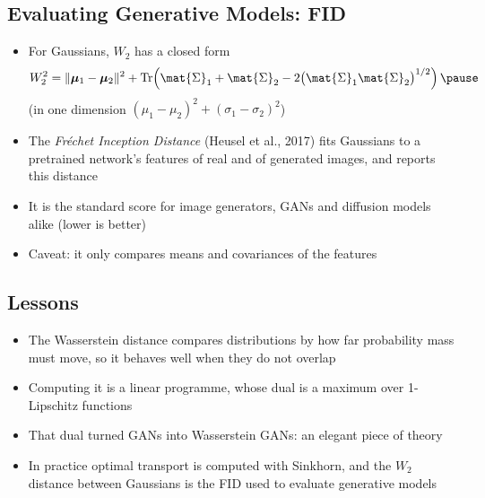 \begin{slide}
\section[-2]{Evaluating Generative Models: FID}

\begin{PauseHighLight}
  \begin{itemize}
  \item For Gaussians, $W_2$ has a closed form
    \begin{align*}
      W_2^2 = \|\bm{\mu}_1-\bm{\mu}_2\|^2 + \mathrm{Tr}\!\left(\mat{\Sigma}_1 +
      \mat{\Sigma}_2 - 2\bigl(\mat{\Sigma}_1\mat{\Sigma}_2\bigr)^{1/2}\right)\pause
    \end{align*}
    (in one dimension $(\mu_1-\mu_2)^2 + (\sigma_1-\sigma_2)^2$)\pause
  \item The \emph{Fr\'echet Inception Distance} (Heusel et al., 2017) fits
    Gaussians to a pretrained network's features of real and of
    generated images, and reports this distance\pause
  \item It is the standard score for image generators, GANs and
    diffusion models alike (lower is better)\pause
  \item Caveat: it only compares means and covariances of the
    features\pause
  \end{itemize}
\end{PauseHighLight}

\end{slide}


\begin{slide}
\section[-1]{Lessons}

\begin{PauseHighLight}
  \begin{itemize}
  \item The Wasserstein distance compares distributions by how far
    probability mass must move, so it behaves well when they do not
    overlap\pause
  \item Computing it is a linear programme, whose dual is a maximum
    over 1-Lipschitz functions\pause
  \item That dual turned GANs into Wasserstein GANs: an elegant piece of
    theory\pause
  \item In practice optimal transport is computed with Sinkhorn, and the
    $W_2$ distance between Gaussians is the FID used to evaluate
    generative models\pause
  \end{itemize}
\end{PauseHighLight}

\end{slide}


